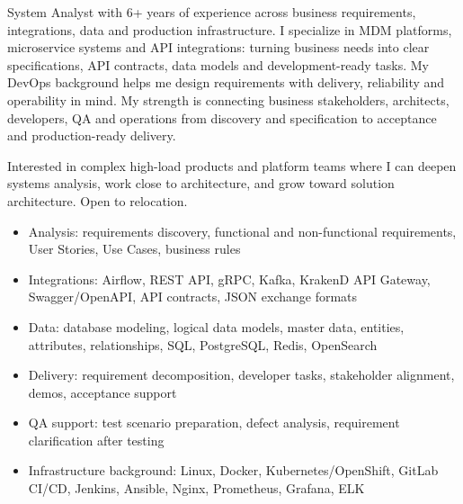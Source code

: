 System Analyst with 6+ years of experience across business requirements,
integrations, data and production infrastructure. I specialize in MDM platforms,
microservice systems and API integrations: turning business needs into clear
specifications, API contracts, data models and development-ready tasks. My
DevOps background helps me design requirements with delivery, reliability and
operability in mind. My strength is connecting business stakeholders,
architects, developers, QA and operations from discovery and specification to
acceptance and production-ready delivery.

Interested in complex high-load products and platform teams where I can deepen
systems analysis, work close to architecture, and grow toward solution
architecture. Open to relocation.

\begin{itemize}[leftmargin=1.3em, itemsep=0.2em]
  \item Analysis: requirements discovery, functional and non-functional requirements, User Stories, Use Cases, business rules
  \item Integrations: Airflow, REST API, gRPC, Kafka, KrakenD API Gateway, Swagger/OpenAPI, API contracts, JSON exchange formats
  \item Data: database modeling, logical data models, master data, entities, attributes, relationships, SQL, PostgreSQL, Redis, OpenSearch
  \item Delivery: requirement decomposition, developer tasks, stakeholder alignment, demos, acceptance support
  \item QA support: test scenario preparation, defect analysis, requirement clarification after testing
  \item Infrastructure background: Linux, Docker, Kubernetes/OpenShift, GitLab CI/CD, Jenkins, Ansible, Nginx, Prometheus, Grafana, ELK
\end{itemize}

